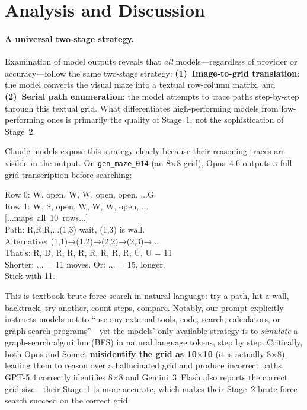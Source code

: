 \documentclass[11pt]{article}
\begin{document}

\section{Analysis and Discussion}
\label{sec:analysis}

\paragraph{A universal two-stage strategy.}
Examination of model outputs reveals that \emph{all} models---regardless of provider or accuracy---follow the same two-stage strategy:
\textbf{(1)~Image-to-grid translation}: the model converts the visual maze into a textual row-column matrix, and
\textbf{(2)~Serial path enumeration}: the model attempts to trace paths step-by-step through this textual grid.
What differentiates high-performing models from low-performing ones is primarily the quality of Stage~1, not the sophistication of Stage~2.

Claude models expose this strategy clearly because their reasoning traces are visible in the output.
On \texttt{gen\_maze\_014} (an 8$\times$8 grid), Opus~4.6 outputs a full grid transcription before searching:

\vspace{2pt}
{\small\ttfamily
\noindent Row 0: W, open, W, W, open, open, ...G\\
Row 1: W, S, open, W, W, W, open, ...\\
\mbox{[...maps all 10 rows...]}\\
Path: R,R,R,...(1,3) wait, (1,3) is wall.\\
Alternative: (1,1)→(1,2)→(2,2)→(2,3)→...\\
That's: R, D, R, R, R, R, R, R, R, U, U = 11\\
Shorter: ... = 11 moves. Or: ... = 15, longer.\\
Stick with 11.}
\vspace{2pt}

This is textbook brute-force search in natural language: try a path, hit a wall, backtrack, try another, count steps, compare.
Notably, our prompt explicitly instructs models not to ``use any external tools, code, search, calculators, or graph-search programs''---yet the models' only available strategy is to \emph{simulate} a graph-search algorithm (BFS) in natural language tokens, step by step.
Critically, both Opus and Sonnet \textbf{misidentify the grid as 10$\times$10} (it is actually 8$\times$8), leading them to reason over a hallucinated grid and produce incorrect paths.
GPT-5.4 correctly identifies 8$\times$8 and Gemini~3~Flash also reports the correct grid size---their Stage~1 is more accurate, which makes their Stage~2 brute-force search succeed on the correct grid.
\end{document}
